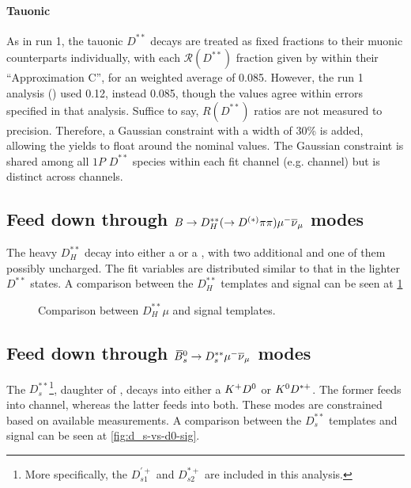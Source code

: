 \paragraph{Tauonic}
As in run 1, the tauonic $D^{**}$ decays are treated as fixed fractions
to their muonic counterparts individually, with each $\mathcal{R}(D^{**})$
fraction given by \cite{Bernlochner_2018} within their ``Approximation C'',
for an weighted average of 0.085.
However, the run 1 \RDst analysis (\cite{LHCb-ANA-2014-052}) used
0.12, instead 0.085,
though the values agree within errors specified in that analysis.
Suffice to say, $R(D^{**})$ ratios are not measured to precision.
Therefore, a Gaussian constraint with a width of 30\% is added,
allowing the yields to float around the nominal values.
The Gaussian constraint is shared among all $1P$ $D^{**}$ species within
each fit channel (e.g. \Dz channel) but is distinct across channels.


\subsection{Feed down through $B \rightarrow D_H^{**}(\rightarrow D^{(*)}\pi\pi){\mu^-}{{\overline{\nu}}_\mu}$ modes}

The heavy $D_H^{**}$ decay into either a \Dz or a \Dstar, with two additional
\pion and one of them possibly uncharged.
The fit variables are distributed similar to that in the lighter
$D^{**}$ states.
A comparison between the $D_H^{**}$ templates and \Dz\taum signal can be
seen at \ref{fig:dstst-heavy-vs-d0-sig}

\begin{figure}[!htb]

    \caption{Comparison between $D_H^{**}\mu$ and \Dz\taum signal templates.}
    \label{fig:dstst-heavy-vs-d0-sig}
\end{figure}


\subsection{Feed down through ${{\kern 0.18em\overline{\kern -0.18em B}}{}^0_{s}} \rightarrow D_s^{**}{\mu^-}{{\overline{\nu}}_\mu}$ modes}

The $D_s^{**}$\footnote{
    More specifically, the $D_{s1}^{'+}$ and $D_{s2}^{*+}$ are included in
    this analysis.
}, daughter of \Bsb, decays into either a ${{K}^+}{{D}^0}$ or ${{K}^0}{{D}^{*+}}$.
The former feeds into \Dz channel, whereas the latter feeds into both.
These modes are constrained based on available measurements.
A comparison between the $D_s^{**}$ templates and \Dz\taum signal can be
seen at \cref{fig:d_s-vs-d0-sig}.

